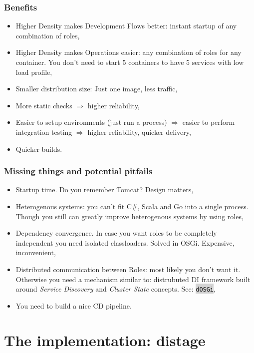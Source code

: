 \documentclass[usenames,dvipsnames]{beamer}
\newcommand{\code}[1]{\colorbox{lightgray}{\texttt{#1}}}
\begin{document}
\begin{frame}
\frametitle{Benefits}
\begin{itemize}
\item Higher Density makes Development Flows better: instant startup of any combination of roles,
\item Higher Density makes Operations easier: any combination of roles for any container. 
    You don't need to start 5 containers to have 5 services with low load profile,
\item Smaller distribution size: Just one image, less traffic,
\item More static checks $\Rightarrow$ higher reliability,
\item Easier to setup environments (just run a process) $\Rightarrow$ easier to perform integration testing $\Rightarrow$ higher reliability, quicker delivery,
\item Quicker builds.
\end{itemize}
\end{frame}

\begin{frame}
\frametitle{Missing things and potential pitfails}
\begin{itemize}
\item Startup time. Do you remember Tomcat? Design matters\footnotemark[1],
\item Heterogenous systems: you can't fit C\#, Scala and Go into a single process. 
      Though you still can greatly improve heterogenous systems by using roles,
\item Dependency convergence. In case you want roles to be completely independent you need
      isolated classloaders. Solved in OSGi. Expensive, inconvenient,
\item Distributed communication between Roles: most likely you don't want it. Otherwise 
      you need a mechanism similar to: distrubuted DI framework 
      built around \textit{Service Discovery} and \textit{Cluster State} concepts. See: \code{dOSGi},
\item You need to build a nice CD pipeline.
\end{itemize}
\end{frame}

\section{The implementation: distage}
\end{document}
